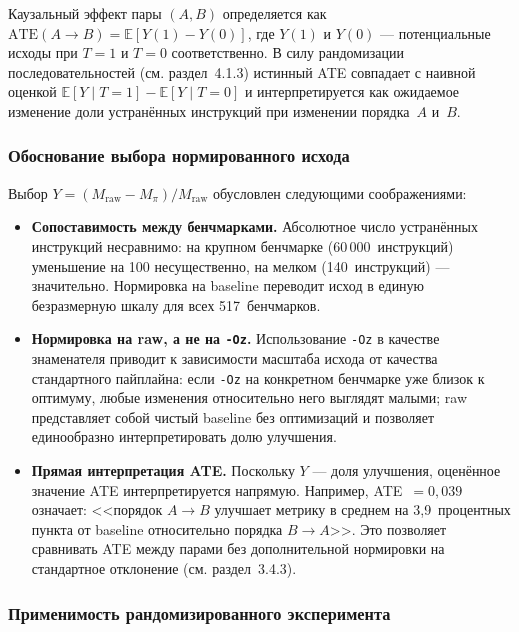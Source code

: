 Каузальный эффект пары $(A, B)$ определяется как $\text{ATE}(A \to B) = \mathbb{E}[Y(1) - Y(0)]$, где $Y(1)$ и $Y(0)$ --- потенциальные исходы при $T = 1$ и $T = 0$ соответственно. В силу рандомизации последовательностей (см. раздел~4.1.3) истинный ATE совпадает с наивной оценкой $\mathbb{E}[Y \mid T = 1] - \mathbb{E}[Y \mid T = 0]$ и интерпретируется как ожидаемое изменение доли устранённых инструкций при изменении порядка~$A$ и~$B$.

\subsubsection{Обоснование выбора нормированного исхода}

Выбор $Y = (M_{\text{raw}} - M_\pi) / M_{\text{raw}}$ обусловлен следующими соображениями:

\begin{itemize}
    \item \textbf{Сопоставимость между бенчмарками.} Абсолютное число устранённых инструкций несравнимо: на крупном бенчмарке (60\,000~инструкций) уменьшение на 100 несущественно, на мелком (140~инструкций) --- значительно. Нормировка на baseline переводит исход в единую безразмерную шкалу для всех 517~бенчмарков.

    \item \textbf{Нормировка на raw, а не на \texttt{-Oz}.} Использование \texttt{-Oz} в качестве знаменателя приводит к зависимости масштаба исхода от качества стандартного пайплайна: если \texttt{-Oz} на конкретном бенчмарке уже близок к оптимуму, любые изменения относительно него выглядят малыми; raw представляет собой чистый baseline без оптимизаций и позволяет единообразно интерпретировать долю улучшения.

    \item \textbf{Прямая интерпретация ATE.} Поскольку $Y$ --- доля улучшения, оценённое значение ATE интерпретируется напрямую. Например, ATE~$= 0{,}039$ означает: <<порядок $A \to B$ улучшает метрику в среднем на 3{,}9~процентных пункта от baseline относительно порядка $B \to A$>>. Это позволяет сравнивать ATE между парами без дополнительной нормировки на стандартное отклонение (см. раздел~3.4.3).
\end{itemize}

\subsubsection{Применимость рандомизированного эксперимента}

